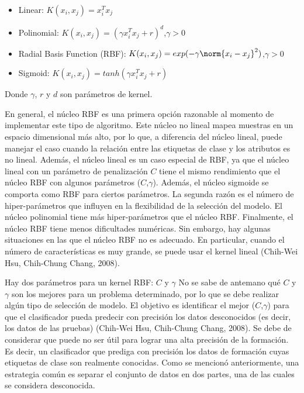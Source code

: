 \begin{itemize}
\item Linear: $K(x_i,x_j ) = x_i^Tx_j$
\item Polinomial: $K(x_i,x_j ) = (\gamma x_i^Tx_j + r)^d$,$\gamma > 0$
\item Radial Basis Function (RBF): $K(x_i,x_j ) = exp(-\gamma \norm{x_i-x_j}^2)$,$\gamma>0$
\item Sigmoid: $K(x_i,x_j ) = tanh(\gamma x_i^Tx_j + r)$
\end{itemize}

Donde $\gamma$, $r$ y $d$ son parámetros de kernel.  

En general, el núcleo RBF es una primera opción razonable al momento de implementar este tipo de algoritmo. Este núcleo no lineal mapea muestras en un espacio dimensional más alto, por lo que, a diferencia del núcleo lineal, puede manejar el caso cuando la relación entre las etiquetas de clase y los atributos es no lineal.  Además, el núcleo lineal es un caso especial de RBF, ya que el núcleo lineal con un parámetro de penalización $C$ tiene el mismo rendimiento que el núcleo RBF con algunos parámetros ($C$,$\gamma$).  Además, el núcleo sigmoide se comporta como RBF para ciertos parámetros. La segunda razón es el número de hiper-parámetros que influyen en la flexibilidad de la selección del modelo.  El núcleo polinomial tiene más hiper-parámetros que el núcleo RBF. Finalmente, el núcleo RBF tiene menos dificultades numéricas. Sin embargo, hay algunas situaciones en las que el núcleo RBF no es adecuado. En particular, cuando el número de características es muy grande, se puede usar el kernel lineal (Chih-Wei Hsu, Chih-Chung Chang, 2008).

Hay dos parámetros para un kernel RBF: $C$ y $\gamma$  No se sabe de antemano qué $C$ y $\gamma$ son los mejores para un problema determinado, por lo que se debe realizar algún tipo de selección de modelo.  El objetivo es identificar el mejor ($C$,$\gamma$) para que el clasificador pueda predecir con precisión los datos desconocidos (es decir, los datos de las pruebas) (Chih-Wei Hsu, Chih-Chung Chang, 2008).  Se debe de considerar que puede no ser útil para lograr una alta precisión de la formación. Es decir, un clasificador que prediga con precisión los datos de formación cuyas etiquetas de clase son realmente conocidas.  Como se mencionó anteriormente, una estrategia común es separar el conjunto de datos en dos partes, una de las cuales se considera desconocida.  

